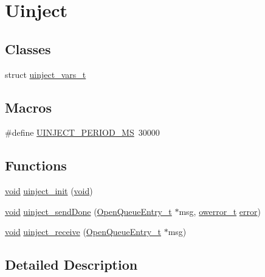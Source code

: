 \hypertarget{group__uinject}{}\section{Uinject}
\label{group__uinject}
\subsection*{Classes}
\begin{DoxyCompactItemize}
\item 
struct \hyperlink{structuinject__vars__t}{uinject\+\_\+vars\+\_\+t}
\end{DoxyCompactItemize}
\subsection*{Macros}
\begin{DoxyCompactItemize}
\item 
\#define \hyperlink{group__uinject_ga5b31a0d33a0be3a28d77fbdba9a3e2b7}{U\+I\+N\+J\+E\+C\+T\+\_\+\+P\+E\+R\+I\+O\+D\+\_\+\+MS}~30000
\end{DoxyCompactItemize}
\subsection*{Functions}
\begin{DoxyCompactItemize}
\item 
\hyperlink{usb__devapi_8h_afabf60e7f57651d6d595a02c75f07cd0}{void} \hyperlink{group__uinject_gac6dcaebf6fba84d30d183c304c65040e}{uinject\+\_\+init} (\hyperlink{usb__devapi_8h_afabf60e7f57651d6d595a02c75f07cd0}{void})
\item 
\hyperlink{usb__devapi_8h_afabf60e7f57651d6d595a02c75f07cd0}{void} \hyperlink{group__uinject_gacd746c671f588346d03cd1fcf3d9d1b7}{uinject\+\_\+send\+Done} (\hyperlink{struct_open_queue_entry__t}{Open\+Queue\+Entry\+\_\+t} $\ast$msg, \hyperlink{opendefs_8h_af20b7c3ed9d2ba19e56a309ad9314803}{owerror\+\_\+t} \hyperlink{disk_8c_ad018a3100b2dabad325a0800152db297}{error})
\item 
\hyperlink{usb__devapi_8h_afabf60e7f57651d6d595a02c75f07cd0}{void} \hyperlink{group__uinject_gab4b19f3980fe96992594b407e7a78752}{uinject\+\_\+receive} (\hyperlink{struct_open_queue_entry__t}{Open\+Queue\+Entry\+\_\+t} $\ast$msg)
\end{DoxyCompactItemize}


\subsection{Detailed Description}


